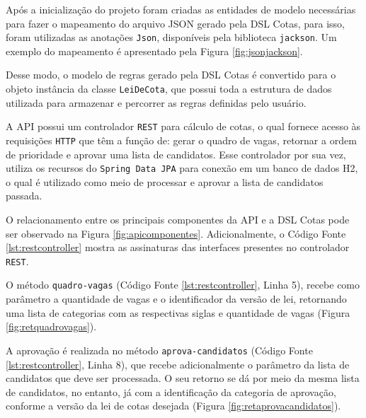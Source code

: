 Após a inicialização do projeto foram criadas as entidades de modelo necessárias para fazer o mapeamento do arquivo JSON gerado pela DSL Cotas, para isso, foram utilizadas as anotações \texttt{Json}, disponíveis pela biblioteca \texttt{jackson}. Um exemplo do mapeamento é apresentado pela Figura \ref{fig:jsonjackson}. 



Desse modo, o modelo de regras gerado pela DSL Cotas é convertido para o objeto instância da classe \texttt{LeiDeCota}, que possui toda a estrutura de dados utilizada para armazenar e percorrer as regras definidas pelo usuário.

A API possui um controlador \texttt{REST} para cálculo de cotas, o qual fornece acesso às requisições \texttt{HTTP} que têm a função de: gerar o quadro de vagas, retornar a ordem de prioridade e aprovar uma lista de candidatos. Esse controlador por sua vez, utiliza os recursos do \texttt{Spring Data JPA} para conexão em um banco de dados H2, o qual é utilizado como meio de processar e aprovar a lista de candidatos passada.


O relacionamento entre os principais componentes da \gls{API} e a DSL Cotas pode ser observado na Figura \ref{fig:apicomponentes}. Adicionalmente, o Código Fonte \ref{lst:restcontroller} mostra as assinaturas das interfaces presentes no controlador \texttt{REST}.





\newpage
O método \texttt{quadro-vagas} (Código Fonte \ref{lst:restcontroller}, Linha 5), recebe como parâmetro a quantidade de vagas e o identificador da versão de lei, retornando uma lista de categorias com as respectivas siglas e quantidade de vagas (Figura \ref{fig:retquadrovagas}).



A aprovação é realizada no método \texttt{aprova-candidatos} (Código Fonte \ref{lst:restcontroller}, Linha 8), que recebe adicionalmente o parâmetro da lista de candidatos que deve ser processada. O seu retorno se dá por meio da mesma lista de candidatos, no entanto, já com a identificação da categoria de aprovação, conforme a versão da lei de cotas desejada (Figura \ref{fig:retaprovacandidatos}).


